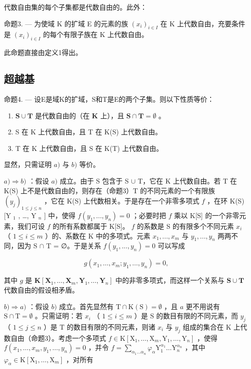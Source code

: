 代数自由集的每个子集都是代数自由的。此外：

命题3. --- 为使域 K 的扩域 E 的元素的族 \((x_{i})_{i\in I}\) 在 K 上代数自由，充要条件是 \((x_{i})_{i\in I}\) 的每个有限子族在 K 上代数自由。

此命题直接由定义1得出。

\subsection{超越基}

命题4. --- 设E是域K的扩域，S和T是E的两个子集。则以下性质等价：

\begin{enumerate}
\def\labelenumi{\alph{enumi})}
\item
  \(\mathbf{S} \cup \mathbf{T}\) 是代数自由的（在 \(\mathbf{K}\) 上），且 \(\mathbf{S} \cap \mathbf{T} = \emptyset\) 。
\item
  S 在 K 上代数自由，且 T 在 K(S) 上代数自由。
\item
  T 在 K 上代数自由，且 S 在 K(T) 上代数自由。
\end{enumerate}

显然，只需证明 \(a)\) 与 \(b)\) 等价。

\(a) \Rightarrow b)\) ：假设 \(a)\) 成立。由于 S 包含于 S \(\cup\) T，它在 K 上代数自由。若 T 在 K(S) 上不是代数自由的，则存在（命题3）T 的不同元素的一个有限族 \((y_j)_{1 \leq j \leq n}\) ，它在 K(S) 上代数相关。于是存在一个非零多项式 \(f\) ，在环 K(S) {[}Y \(_1\) , \ldots, Y \(_n\) {]} 中，使得 \(f(y_1, ..., y_n) = 0\) ；必要时把 \(f\) 乘以 K{[}S{]} 的一个非零元素，我们可设 \(f\) 的所有系数都属于 K{[}S{]}。 \(f\) 的系数是 S 的有限多个不同元素 \(x_i\) （ \(1 \leq i \leq m\) ）的、系数在 K 中的多项式。元素 \(x_1, ..., x_m\) 与 \(y_1, ..., y_n\) 两两不同，因为 S \(\cap\) T = ∅。于是关系 \(f(y_1, ..., y_n) = 0\) 可以写成

\[
g \left(x _ {1}, \dots , x _ {m}; y _ {1}, \dots , y _ {n}\right) = 0,
\]

其中 \(g\) 是 \(\mathbf{K}[\mathbf{X}_1, \ldots, \mathbf{X}_m, \mathbf{Y}_1, \ldots, \mathbf{Y}_n]\) 中的非零多项式，而这样一个关系与 \(\mathbf{S} \cup \mathbf{T}\) 代数自由的假设相矛盾。

\(b) \Rightarrow a)\) ：假设 \(b)\) 成立。首先显然有 \(\mathrm{T} \cap \mathrm{K}(\mathrm{S}) = \emptyset\) ，且 \(a\) 更不用说有 \(\mathrm{S} \cap \mathrm{T} = \emptyset\) 。只需证明：若 \(x_i\) （ \(1 \leqslant i \leqslant m\) ）是 \(\mathrm{S}\) 的数目有限的不同元素，而 \(y_j\) （ \(1 \leqslant j \leqslant n\) ）是 \(\mathrm{T}\) 的数目有限的不同元素，则诸 \(x_i\) 与 \(y_j\) 组成的集合在 \(\mathrm{K}\) 上代数自由（命题3）。考虑一个多项式 \(f \in \mathrm{K}[\mathrm{X}_1, \ldots, \mathrm{X}_m, \mathrm{Y}_1, \ldots, \mathrm{Y}_n]\) ，使得 \(f(x_1, \ldots, x_m, y_1, \ldots, y_n) = 0\) ，并令 \(f = \sum_{\alpha_1 \ldots \alpha_n} \varphi_\alpha \mathrm{Y}_1^{\alpha_1} \ldots \mathrm{Y}_n^{\alpha_n}\) ，其中 \(\varphi_\alpha \in \mathrm{K}[\mathrm{X}_1, \ldots, \mathrm{X}_m]\) ，对所有

